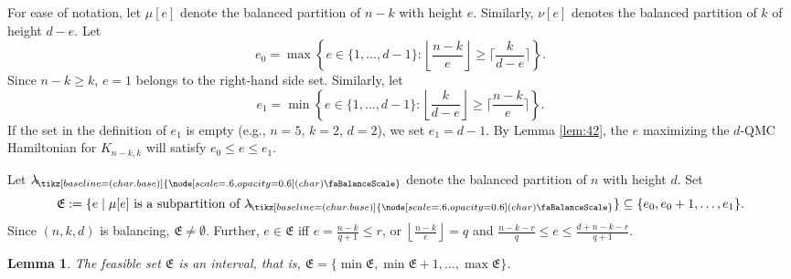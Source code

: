 \documentclass[12pt,dvipsnames,accepted=2016-08-18,a4paper,onecolumn]{quantumarticle}
\newcommand{\floor}[1]{\left\lfloor #1 \right\rfloor}
\def\bal{\tikz[baseline=(char.base)]{
  \node[scale=.6,opacity=0.6] (char) {\faBalanceScale}}
}
\def\lab{\lambda_{\!\bal}}
\numberwithin{equation}{section}
\newtheorem{lemma}[theorem]{Lemma}
\theoremstyle{definition}
\begin{document}
For ease of notation,   
let $\mu[e]$ denote the balanced partition of $n-k$
 with height $e$. Similarly, 
$\nu[e]$ denotes the balanced partition of $k$ of height $d-e$. 
 Let
\begin{equation}\label{eq:defe0}
    e_0=\max \left\{e\in\{1,\ldots,d-1\} \colon \floor{\frac{n-k}e} \geq \bigg\lceil\frac{k}{d-e}\bigg\rceil  \right\}.
\end{equation}
Since $n-k\geq k$, $e=1$ belongs to the right-hand side set.
Similarly, let
\begin{equation}\label{eq:defe1}
    e_1=\min \left\{e\in\{1,\ldots,d-1\} \colon
\floor{\frac{k}{d-e}} \geq 
     \bigg\lceil\frac{n-k}e\bigg\rceil \right\}.
\end{equation}
If the set in the definition of $e_1$ is empty
(e.g., $n=5$, $k=2$, $d=2$), we set $e_1=d-1$. 
By Lemma \ref{lem:42}, the  $e$ maximizing the $d$-QMC Hamiltonian for $K_{n-k,k}$ will satisfy $e_0\leq e\leq e_1$.

Let $\lab$
denote the balanced partition of $n$ with height $d$.
Set 
\[
    \mathfrak E:=\{e \mid \mu[e] \text{ is a subpartition of }\lab \} \subseteq \{e_0, e_0+1,\ldots,e_1\}. 
\]
 Since $(n,k,d)$ is balancing, $\mathfrak E\neq\emptyset$.
 Further, $e\in\mathfrak E$ iff 
$e=\frac{n-k}{q+1}\le r$, or
$\floor{\frac{n-k}e}=q$ and $\frac{n-k-r}{q}\le e\le \frac{d+n-k-r}{q+1}$.

\begin{lemma}\label{lem:frakinterval}
The feasible set $\mathfrak E$ is an interval, that is,
$\mathfrak E=\{\min \mathfrak E, \min \mathfrak E+1,\ldots, \max \mathfrak E \}$.
\end{lemma}
\end{document}
